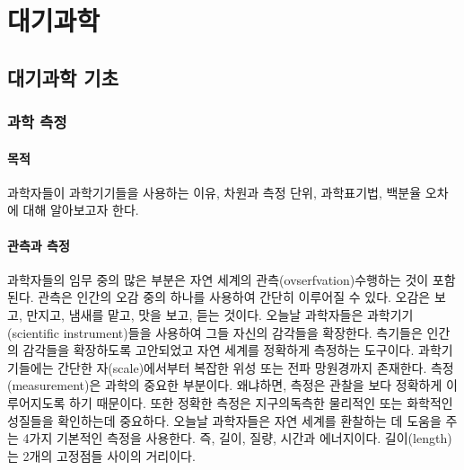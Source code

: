 

\part{대기과학}



\chapter{대기과학 기초}


\section{과학 측정}

\subsection{목적}

과학자들이 과학기기들을 사용하는 이유, 차원과 측정 단위, 과학표기법, 백분율 오차에 대해 알아보고자 한다.

\subsection{관측과 측정}

과학자들의 임무 중의 많은 부분은 자연 세계의 관측(ovserfvation)\을 수행하는 것이 포함된다. 관측은 인간의 오감 중의 하나를 사용하여 간단히 이루어질 수 있다. 오감은 보고, 만지고, 냄새를 맡고, 맛을 보고, 듣는 것이다. 오늘날 과학자들은 과학기기(scientific instrument)들을 사용하여 그들 자신의 감각들을 확장한다. 측기들은 인간의 감각들을 확장하도록 고안되었고 자연 세계를 정확하게 측정하는 도구이다. 과학기기들에는 간단한 자(scale)에서부터 복잡한 위성 또는 전파 망원경까지 존재한다. 측정(measurement)은 과학의 중요한 부분이다. 왜냐하면, 측정은 관찰을 보다 정확하게 이루어지도록 하기 때문이다.
또한 정확한 측정은 지구의독측한 물리적인 또는 화학적인 성질들을 확인하는데 중요하다. 오늘날 과학자들은 자연 세계를 환찰하는 데 도움을 주는 4가지 기본적인 측정을 사용한다. 즉, 길이, 질량, 시간과 에너지이다. 길이(length)는 2개의 고정점들 사이의 거리이다. 


